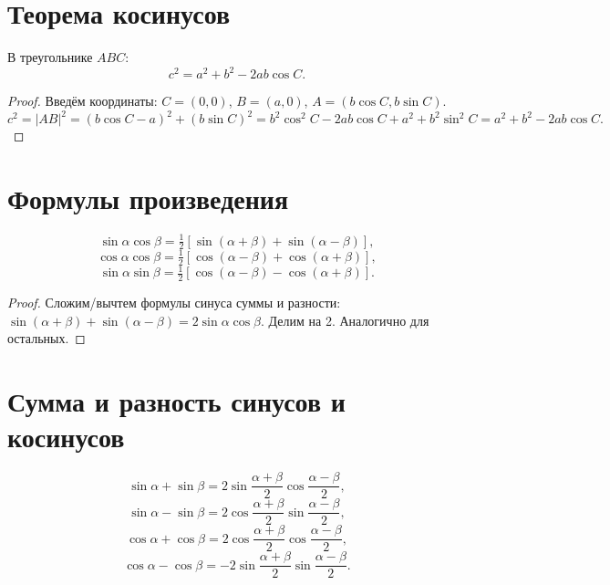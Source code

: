 \documentclass[12pt]{article}
\begin{document}
\section{Теорема косинусов}

\begin{theorem}
В треугольнике $ABC$:
\[
c^2 = a^2 + b^2 - 2ab\cos C.
\]
\end{theorem}

\begin{proof}
Введём координаты: $C = (0,0)$, $B = (a, 0)$,
$A = (b\cos C, b\sin C)$.
\[
c^2 = |AB|^2 = (b\cos C - a)^2 + (b\sin C)^2
= b^2\cos^2 C - 2ab\cos C + a^2 + b^2\sin^2 C
= a^2 + b^2 - 2ab\cos C.
\]
\end{proof}

\section{Формулы произведения}

\begin{theorem}
\[
\sin\alpha\cos\beta = \tfrac{1}{2}[\sin(\alpha+\beta) + \sin(\alpha-\beta)],
\]
\[
\cos\alpha\cos\beta = \tfrac{1}{2}[\cos(\alpha-\beta) + \cos(\alpha+\beta)],
\]
\[
\sin\alpha\sin\beta = \tfrac{1}{2}[\cos(\alpha-\beta) - \cos(\alpha+\beta)].
\]
\end{theorem}

\begin{proof}
Сложим/вычтем формулы синуса суммы и разности:
$\sin(\alpha+\beta) + \sin(\alpha-\beta)
= 2\sin\alpha\cos\beta$. Делим на 2.
Аналогично для остальных.
\end{proof}

\section{Сумма и разность синусов и косинусов}

\begin{theorem}
\[
\sin\alpha + \sin\beta = 2\sin\frac{\alpha+\beta}{2}\cos\frac{\alpha-\beta}{2},
\]
\[
\sin\alpha - \sin\beta = 2\cos\frac{\alpha+\beta}{2}\sin\frac{\alpha-\beta}{2},
\]
\[
\cos\alpha + \cos\beta = 2\cos\frac{\alpha+\beta}{2}\cos\frac{\alpha-\beta}{2},
\]
\[
\cos\alpha - \cos\beta = -2\sin\frac{\alpha+\beta}{2}\sin\frac{\alpha-\beta}{2}.
\]
\end{theorem}
\end{document}
